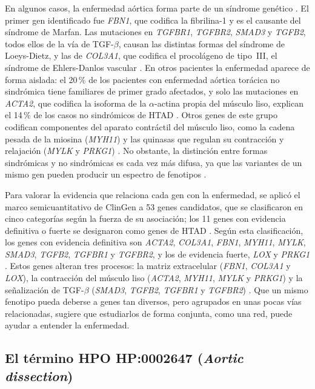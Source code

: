 En algunos casos, la enfermedad aórtica forma parte de un síndrome genético \cite{Pinard2019}. El primer gen identificado fue \textit{FBN1}, que codifica la fibrilina-1 y es el causante del síndrome de Marfan. Las mutaciones en \textit{TGFBR1}, \textit{TGFBR2}, \textit{SMAD3} y \textit{TGFB2}, todos ellos de la vía de TGF-$\beta$, causan las distintas formas del síndrome de Loeys-Dietz, y las de \textit{COL3A1}, que codifica el procolágeno de tipo~III, el síndrome de Ehlers-Danlos vascular \cite{Pinard2019}. En otros pacientes la enfermedad aparece de forma aislada: el 20\,\% de los pacientes con enfermedad aórtica torácica no sindrómica tiene familiares de primer grado afectados, y solo las mutaciones en \textit{ACTA2}, que codifica la isoforma de la $\alpha$-actina propia del músculo liso, explican el 14\,\% de los casos no sindrómicos de HTAD \cite{Pinard2019}. Otros genes de este grupo codifican componentes del aparato contráctil del músculo liso, como la cadena pesada de la miosina (\textit{MYH11}) y las quinasas que regulan su contracción y relajación (\textit{MYLK} y \textit{PRKG1}) \cite{Pinard2019}. No obstante, la distinción entre formas sindrómicas y no sindrómicas es cada vez más difusa, ya que las variantes de un mismo gen pueden producir un espectro de fenotipos \cite{Pinard2019}.

Para valorar la evidencia que relaciona cada gen con la enfermedad, se aplicó el marco semicuantitativo de ClinGen a 53 genes candidatos, que se clasificaron en cinco categorías según la fuerza de su asociación; los 11 genes con evidencia definitiva o fuerte se designaron como genes de HTAD \cite{Pinard2019,Renard2018}. Según esta clasificación, los genes con evidencia definitiva son \textit{ACTA2}, \textit{COL3A1}, \textit{FBN1}, \textit{MYH11}, \textit{MYLK}, \textit{SMAD3}, \textit{TGFB2}, \textit{TGFBR1} y \textit{TGFBR2}, y los de evidencia fuerte, \textit{LOX} y \textit{PRKG1} \cite{Pinard2019,Renard2018}. Estos genes alteran tres procesos: la matriz extracelular (\textit{FBN1}, \textit{COL3A1} y \textit{LOX}), la contracción del músculo liso (\textit{ACTA2}, \textit{MYH11}, \textit{MYLK} y \textit{PRKG1}) y la señalización de TGF-$\beta$ (\textit{SMAD3}, \textit{TGFB2}, \textit{TGFBR1} y \textit{TGFBR2}) \cite{Pinard2019}. Que un mismo fenotipo pueda deberse a genes tan diversos, pero agrupados en unas pocas vías relacionadas, sugiere que estudiarlos de forma conjunta, como una red, puede ayudar a entender la enfermedad.

\subsection{El término HPO HP:0002647 (\textit{Aortic dissection})}


